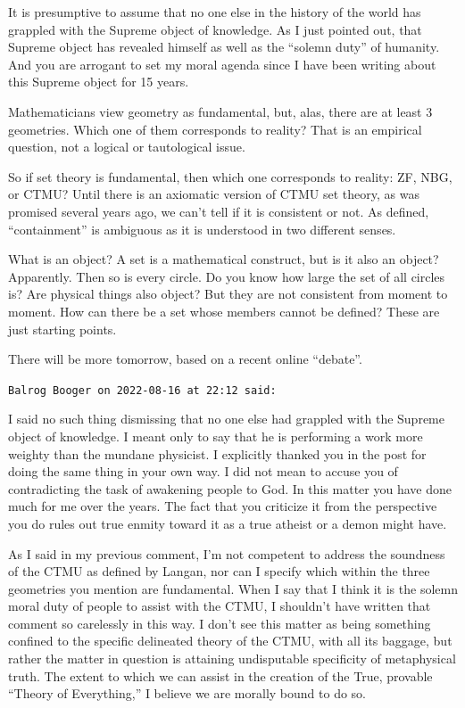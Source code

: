 \begin{footnotesize}
\begin{sffamily}
It is presumptive to assume that no one else in the history of the world has grappled with the Supreme object of knowledge. As I just pointed out, that Supreme object has revealed himself as well as the ``solemn duty'' of humanity. And you are arrogant to set my moral agenda since I have been writing about this Supreme object for 15 years.

Mathematicians view geometry as fundamental, but, alas, there are at least 3 geometries. Which one of them corresponds to reality? That is an empirical question, not a logical or tautological issue.

So if set theory is fundamental, then which one corresponds to reality: ZF, NBG, or CTMU? Until there is an axiomatic version of CTMU set theory, as was promised several years ago, we can't tell if it is consistent or not. As defined, ``containment'' is ambiguous as it is understood in two different senses.

What is an object? A set is a mathematical construct, but is it also an object? Apparently. Then so is every circle. Do you know how large the set of all circles is? Are physical things also object? But they are not consistent from moment to moment. How can there be a set whose members cannot be defined? These are just starting points.

There will be more tomorrow, based on a recent online ``debate''.

\hfill

\texttt{Balrog Booger on 2022-08-16 at 22:12 said:}

I said no such thing dismissing that no one else had grappled with the Supreme object of knowledge. I meant only to say that he is performing a work more weighty than the mundane physicist. I explicitly thanked you in the post for doing the same thing in your own way. I did not mean to accuse you of contradicting the task of awakening people to God. In this matter you have done much for me over the years. The fact that you criticize it from the perspective you do rules out true enmity toward it as a true atheist or a demon might have.

As I said in my previous comment, I'm not competent to address the soundness of the CTMU as defined by Langan, nor can I specify which within the three geometries you mention are fundamental. When I say that I think it is the solemn moral duty of people to assist with the CTMU, I shouldn't have written that comment so carelessly in this way. I don't see this matter as being something confined to the specific delineated theory of the CTMU, with all its baggage, but rather the matter in question is attaining undisputable specificity of metaphysical truth. The extent to which we can assist in the creation of the True, provable ``Theory of Everything,'' I believe we are morally bound to do so.


\end{sffamily}
\end{footnotesize}

